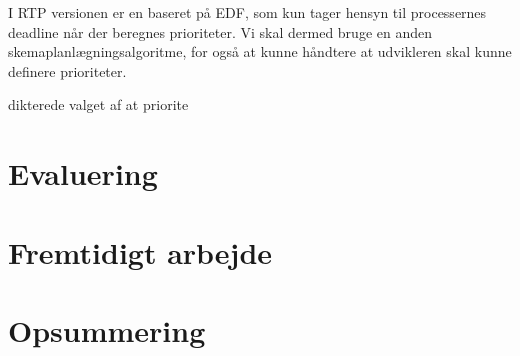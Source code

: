 I RTP versionen er \sched en baseret på EDF, som kun tager hensyn til processernes deadline når der beregnes prioriteter. Vi skal dermed bruge en anden skemaplanlægningsalgoritme, for også at kunne håndtere at udvikleren skal kunne definere prioriteter.

 dikterede valget af \sched at priorite


    
\section{Evaluering}
\section{Fremtidigt arbejde}
\section{Opsummering}
